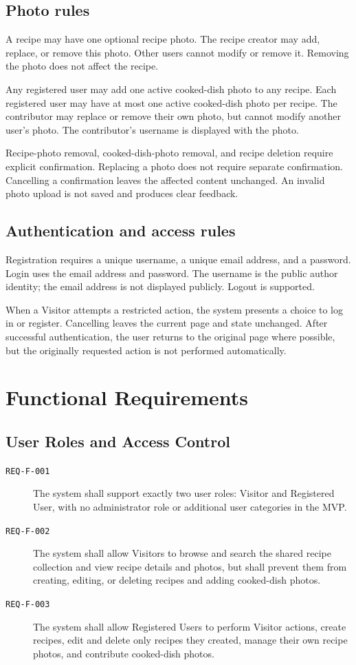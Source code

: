 \documentclass[12pt]{article}
\begin{document}
\subsection{Photo rules}
A recipe may have one optional recipe photo. The recipe creator may add, replace, or remove this photo. Other users cannot modify or remove it. Removing the photo does not affect the recipe.

Any registered user may add one active cooked-dish photo to any recipe. Each registered user may have at most one active cooked-dish photo per recipe. The contributor may replace or remove their own photo, but cannot modify another user's photo. The contributor's username is displayed with the photo.

Recipe-photo removal, cooked-dish-photo removal, and recipe deletion require explicit confirmation. Replacing a photo does not require separate confirmation. Cancelling a confirmation leaves the affected content unchanged. An invalid photo upload is not saved and produces clear feedback.

\subsection{Authentication and access rules}
Registration requires a unique username, a unique email address, and a password. Login uses the email address and password. The username is the public author identity; the email address is not displayed publicly. Logout is supported.

When a Visitor attempts a restricted action, the system presents a choice to log in or register. Cancelling leaves the current page and state unchanged. After successful authentication, the user returns to the original page where possible, but the originally requested action is not performed automatically.

\section{Functional Requirements}

\subsection{User Roles and Access Control}
\begin{description}
    \item[\texttt{REQ-F-001}] The system shall support exactly two user roles: Visitor and Registered User, with no administrator role or additional user categories in the MVP.
    \item[\texttt{REQ-F-002}] The system shall allow Visitors to browse and search the shared recipe collection and view recipe details and photos, but shall prevent them from creating, editing, or deleting recipes and adding cooked-dish photos.
    \item[\texttt{REQ-F-003}] The system shall allow Registered Users to perform Visitor actions, create recipes, edit and delete only recipes they created, manage their own recipe photos, and contribute cooked-dish photos.
\end{description}
\end{document}
